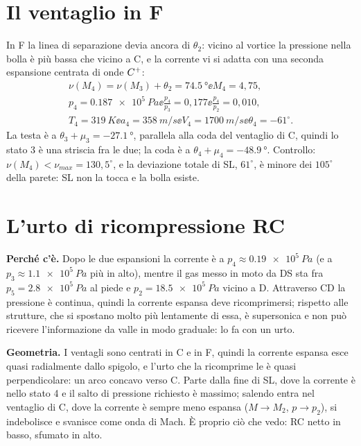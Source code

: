 \section*{Il ventaglio in F}
In F la linea di separazione devia ancora di $\theta_2$: vicino al vortice la pressione nella bolla è più bassa che
vicino a C, e la corrente vi si adatta con una seconda espansione centrata di onde $C^{+}$:
\begin{gather*}
  \nu(M_4)=\nu(M_3)+\theta_2=\SI{74.5}{\degree} \ee M_4=4{,}75,\\
  p_4=\SI{0.187e5}{Pa} \ee \frac{p_4}{p_3}=0{,}177 \ee \frac{p_4}{p_2}=0{,}010,\\
  T_4=\SI{319}{K} \ee a_4=\SI{358}{m/s} \ee V_4=\SI{1700}{m/s} \ee \theta_4=-61^\circ .
\end{gather*}
La testa è a $\theta_3+\mu_3=\SI{-27.1}{\degree}$, parallela alla coda del ventaglio di C, quindi lo stato 3 è una
striscia fra le due; la coda è a $\theta_4+\mu_4=\SI{-48.9}{\degree}$. Controllo: $\nu(M_4)<\nu_{max}=130{,}5^\circ$, e
la deviazione totale di SL, $61^\circ$, è minore dei $105^\circ$ della parete: SL non la tocca e la bolla esiste.

\section*{L'urto di ricompressione RC}
\textbf{Perché c'è.} Dopo le due espansioni la corrente è a $p_4\approx\SI{0.19e5}{Pa}$ (e a
$p_3\approx\SI{1.1e5}{Pa}$ più in alto), mentre il gas messo in moto da DS sta fra $p_5=\SI{2.8e5}{Pa}$ al piede e
$p_2=\SI{18.5e5}{Pa}$ vicino a D. Attraverso CD la pressione è continua, quindi la corrente espansa deve
ricomprimersi; rispetto alle strutture, che si spostano molto più lentamente di essa, è supersonica e non può
ricevere l'informazione da valle in modo graduale: lo fa con un urto.

\textbf{Geometria.} I ventagli sono centrati in C e in F, quindi la corrente espansa esce quasi radialmente dallo
spigolo, e l'urto che la ricomprime le è quasi perpendicolare: un arco concavo verso C. Parte dalla fine di SL, dove
la corrente è nello stato 4 e il salto di pressione richiesto è massimo; salendo entra nel ventaglio di C, dove la
corrente è sempre meno espansa ($M\to M_2$, $p\to p_2$), si indebolisce e svanisce come onda di Mach. È proprio ciò
che vedo: RC netto in basso, sfumato in alto.

